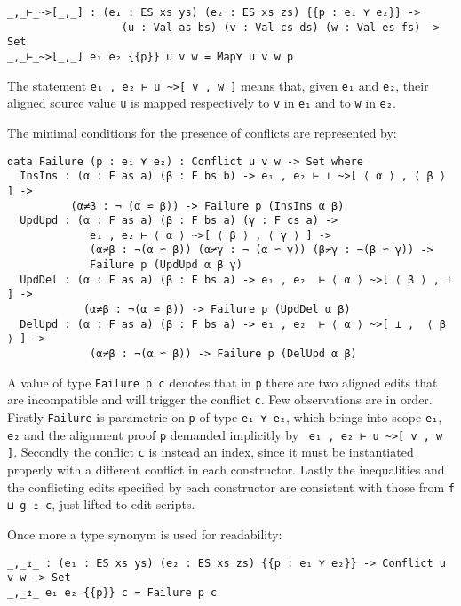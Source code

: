 \documentclass[../Thesis.tex]{subfiles}
\begin{document}
\begin{verbatim}
_,_⊢_~>[_,_] : (e₁ : ES xs ys) (e₂ : ES xs zs) {{p : e₁ ⋎ e₂}} -> 
                  (u : Val as bs) (v : Val cs ds) (w : Val es fs) -> Set
_,_⊢_~>[_,_] e₁ e₂ {{p}} u v w = Map⋎ u v w p
\end{verbatim}

	The statement \texttt{e₁ , e₂ ⊢ u \textasciitilde>[ v , w ]} means that, given
	\texttt{e₁} and \texttt{e₂}, their aligned source value \texttt{u} is mapped
	respectively to \texttt{v} in \texttt{e₁} and to \texttt{w} in \texttt{e₂}.

	The minimal conditions for the presence of conflicts are represented
	by:
\begin{verbatim}
data Failure (p : e₁ ⋎ e₂) : Conflict u v w -> Set where
  InsIns : (α : F as a) (β : F bs b) -> e₁ , e₂ ⊢ ⊥ ~>[ ⟨ α ⟩ , ⟨ β ⟩ ] ->
          (α≠β : ¬ (α ⋍ β)) -> Failure p (InsIns α β)
  UpdUpd : (α : F as a) (β : F bs a) (γ : F cs a) -> 
             e₁ , e₂ ⊢ ⟨ α ⟩ ~>[ ⟨ β ⟩ , ⟨ γ ⟩ ] ->
             (α≠β : ¬(α ⋍ β)) (α≠γ : ¬ (α ⋍ γ)) (β≠γ : ¬(β ⋍ γ)) -> 
             Failure p (UpdUpd α β γ)
  UpdDel : (α : F as a) (β : F bs a) -> e₁ , e₂  ⊢ ⟨ α ⟩ ~>[ ⟨ β ⟩ , ⊥ ] ->
            (α≠β : ¬(α ⋍ β)) -> Failure p (UpdDel α β)
  DelUpd : (α : F as a) (β : F bs a) -> e₁ , e₂  ⊢ ⟨ α ⟩ ~>[ ⊥ ,  ⟨ β ⟩ ] ->
             (α≠β : ¬(α ⋍ β)) -> Failure p (DelUpd α β)
\end{verbatim}

	A value of type \texttt{Failure p c} denotes that in \texttt{p} there are
	two aligned edits that are incompatible and will trigger the conflict 
	\texttt{c}.
	Few observations are in order.
	Firstly \texttt{Failure} is parametric on \texttt{p} of type \texttt{e₁ ⋎ e₂}, 
	which brings into scope \texttt{e₁}, \texttt{e₂} and the alignment proof 
	\texttt{p} demanded 
	implicitly by \texttt{ e₁ , e₂ ⊢ u \textasciitilde>[ v , w ]}.
	Secondly the conflict \texttt{c} is instead an index, since it must be
	instantiated properly with a different conflict in each constructor.
	Lastly the inequalities and the conflicting edits specified by each 
	constructor are consistent with those from \texttt{f ⊔ g ↥ c}, just lifted to
	edit scripts.

	Once more a type synonym is used for readability:
\begin{verbatim}
_,_↥_ : (e₁ : ES xs ys) (e₂ : ES xs zs) {{p : e₁ ⋎ e₂}} -> Conflict u v w -> Set
_,_↥_ e₁ e₂ {{p}} c = Failure p c 
\end{verbatim}
	
\end{document}
